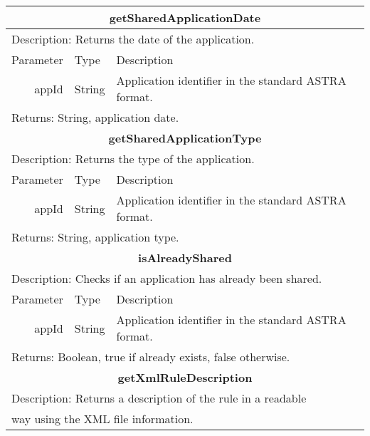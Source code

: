 \begin{table}[h!]
	\small
    \begin{center}
		\begin{tabular}{||r|l|l||}
        

        
		\hline \hline
		\multicolumn{3}{||c||}{\bfseries{getSharedApplicationDate}} \\
		\hline
		\hline 
		\multicolumn{3}{||l||}{Description: Returns the date of the
		application.} \\ \hline \hline Parameter & Type & Description \\ 
		\hline \hline
			appId & String & Application identifier in the standard ASTRA format. \\
		\hline \hline
		\multicolumn{3}{||l||}{Returns: String, application date.} \\
		\hline \hline
        
	
		\hline \hline
		\multicolumn{3}{||c||}{\bfseries{getSharedApplicationType}} \\
		\hline
		\hline 
		\multicolumn{3}{||l||}{Description: Returns the type of the
		application.} \\ \hline \hline Parameter & Type & Description \\ 
		\hline \hline
			appId & String & Application identifier in the standard ASTRA format. \\
		\hline \hline
		\multicolumn{3}{||l||}{Returns: String, application type.} \\
		\hline \hline
		
		\hline \hline
		\multicolumn{3}{||c||}{\bfseries{isAlreadyShared}} \\
		\hline
		\hline 
		\multicolumn{3}{||l||}{Description: Checks if an application has already been
		shared.} \\ \hline \hline Parameter & Type & Description \\ \hline \hline
			appId & String & Application identifier in the standard ASTRA format. \\
		\hline \hline
		\multicolumn{3}{||l||}{Returns: Boolean, true if already exists, false
		otherwise.} \\ \hline \hline
		
		\hline \hline
		\multicolumn{3}{||c||}{\bfseries{getXmlRuleDescription}} \\
		\hline
		\hline 
		\multicolumn{3}{||l||}{Description: Returns a description of the rule in a
		readable} \\ 
		\multicolumn{3}{||l||}{way using the XML file information.} \\ 
		

\end{tabular}
\end{center}
\end{table}
